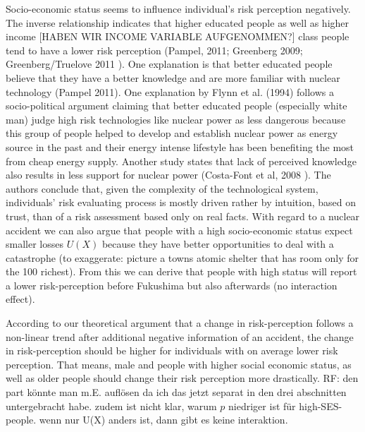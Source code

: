 Socio-economic status seems to influence individual's risk perception negatively. The inverse relationship indicates that higher educated people as well as higher income [HABEN WIR INCOME VARIABLE AUFGENOMMEN?] class people tend to have a lower risk perception (Pampel, 2011; Greenberg 2009; Greenberg/Truelove 2011 \citep{Pampel:2011cx,Greenberg:2009fx,Greenberg:2011ja}).  One explanation is that better educated people believe that they have a better knowledge and are more familiar with nuclear technology (Pampel 2011). One explanation by Flynn et al. (1994) \citep{Flynn:1994dn} follows a socio-political argument claiming that better educated people    (especially white man) judge high risk technologies like nuclear power as less dangerous because this group of people helped to develop and establish nuclear power as energy source in the past and their energy intense lifestyle has been benefiting the most from cheap energy supply. Another study states that lack of perceived knowledge also results in less support for nuclear power  (Costa-Font et al, 2008 \citep{CostaFont:2008hf}).  The authors conclude that, given the complexity of the technological system, individuals' risk evaluating process is mostly driven rather by intuition, based on trust, than of a risk assessment based only on real facts. With regard to a nuclear accident we can also argue that people with a high socio-economic status expect smaller losses $U(X)$ because they have better opportunities to deal with a catastrophe (to exaggerate: picture a towns atomic shelter that has room only for the 100 richest). From this we can derive that people with high status will report a lower risk-perception before Fukushima but also afterwards (no interaction effect).

According to our theoretical argument that a change in risk-perception follows a non-linear trend after additional negative information of an accident, the change in risk-perception should be higher for individuals with on average lower risk perception.  That means, male and people with higher social economic status, as well as older people should change their risk perception more drastically. 
RF: den part könnte man m.E. auflösen da ich das jetzt separat in den drei abschnitten untergebracht habe. zudem ist nicht klar, warum $p$ niedriger ist für high-SES-people. wenn nur U(X) anders ist, dann gibt es keine interaktion.
 
